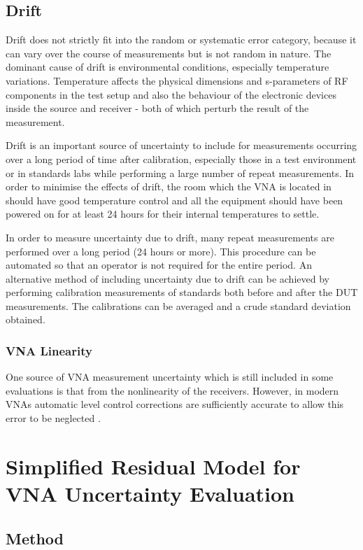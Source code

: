 \documentclass[../thesis/thesis.tex]{subfiles}
\begin{document}
\subsection{Drift}

Drift does not strictly fit into the random or systematic error category, because it can vary over the course of measurements but is not random in nature. The dominant cause of drift is environmental conditions, especially temperature variations. Temperature affects the physical dimensions and s-parameters of RF components in the test setup and also the behaviour of the electronic devices inside the source and receiver - both of which perturb the result of the measurement.

Drift is an important source of uncertainty to include for measurements occurring over a long period of time after calibration, especially those in a test environment or in standards labs while performing a large number of repeat measurements. In order to minimise the effects of drift, the room which the VNA is located in should have good temperature control and all the equipment should have been powered on for at least 24 hours for their internal temperatures to settle.

In order to measure uncertainty due to drift, many repeat measurements are performed over a long period (24 hours or more). This procedure can be automated so that an operator is not required for the entire period. An alternative method of including uncertainty due to drift can be achieved by performing calibration measurements of standards both before and after the DUT measurements. The calibrations can be averaged and a crude standard deviation obtained.

\subsubsection{VNA Linearity}

One source of VNA measurement uncertainty which is still included in some evaluations is that from the nonlinearity of the receivers. However, in modern VNAs automatic level control corrections are sufficiently accurate to allow this error to be neglected \cite{Rytting_2001, Martens_2007}.

\section{Simplified Residual Model for VNA Uncertainty Evaluation}
\subsection{Method}
\end{document}
